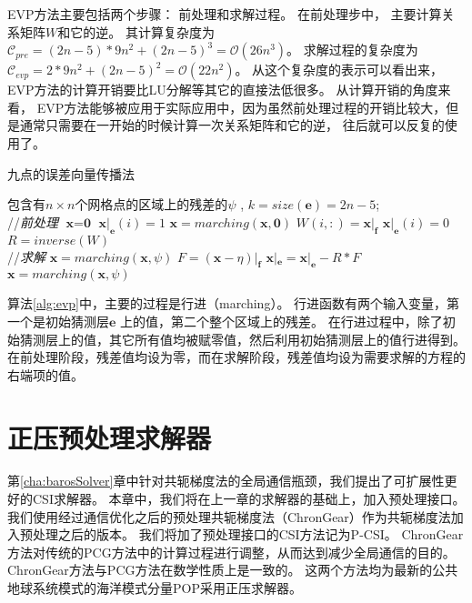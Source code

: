  
EVP方法主要包括两个步骤： 前处理和求解过程。 
在前处理步中， 主要计算关系矩阵$W$和它的逆。 其计算复杂度为$\mathcal{C}_{pre}=
(2n-5)* 9n^2 + (2n-5)^3 = \mathcal {O} (26n^3)$。 
求解过程的复杂度为$\mathcal{C}_{evp}= 2* 9n^2 + (2n-5)^2 = \mathcal{O} (22n^2)$。 
从这个复杂度的表示可以看出来，EVP方法的计算开销要比LU分解等其它的直接法低很多。 
从计算开销的角度来看， EVP方法能够被应用于实际应用中，因为虽然前处理过程的开销比较大，但是通常只需要在一开始的时候计算一次关系矩阵和它的逆， 往后就可以反复的使用了。

\begin{algorithm}[t!]
\caption{九点的误差向量传播法}
\label{alg:evp}
\begin{algorithmic}[1]
\REQUIRE 包含有$n\times n$个网格点的区域上的残差的$\psi$ , $k = size(\textbf{e})=2n-5$; \\
//\qquad \textit{前处理}
\STATE  $\textbf{x} = \textbf{0}$
\STATE $\textbf{x}|_\textbf{e}(i) = 1$
\STATE $\textbf{x} = marching(\textbf{x},\textbf{0})$
\STATE $W(i,:) = \textbf{x}|_\textbf{f}$
\STATE $\textbf{x}|_\textbf{e}(i) = 0$
\ENDFOR
\STATE $R = inverse(W)$ \\
//\qquad \textit{求解 }
\STATE $\textbf{x}= marching(\textbf{x},\psi)$
\STATE $F = (\textbf{x} - \eta)|_\textbf{f}$ 
\STATE $\textbf{x}|_\textbf{e} =\textbf{x}|_\textbf{e} - R*F$ 
\STATE $\textbf{x} = marching(\textbf{x},\psi)$
\end{algorithmic}
\end{algorithm}

算法\ref{alg:evp}中，主要的过程是行进（marching）。
行进函数有两个输入变量，第一个是初始猜测层$\textbf{e}$ 上的值，第二个整个区域上的残差。 
在行进过程中，除了初始猜测层上的值，其它所有值均被赋零值，然后利用初始猜测层上的值行进得到。
在前处理阶段，残差值均设为零，而在求解阶段，残差值均设为需要求解的方程的右端项的值。

\section{正压预处理求解器}
第\ref{cha:barosSolver}章中针对共轭梯度法的全局通信瓶颈，我们提出了可扩展性更好的CSI求解器。 
本章中，我们将在上一章的求解器的基础上，加入预处理接口。
我们使用经过通信优化之后的预处理共轭梯度法（ChronGear）作为共轭梯度法加入预处理之后的版本。
我们将加了预处理接口的CSI方法记为P-CSI。
ChronGear方法对传统的PCG方法中的计算过程进行调整，从而达到减少全局通信的目的。
ChronGear方法与PCG方法在数学性质上是一致的。
这两个方法均为最新的公共地球系统模式的海洋模式分量POP采用正压求解器\cite{yong2015}。 

